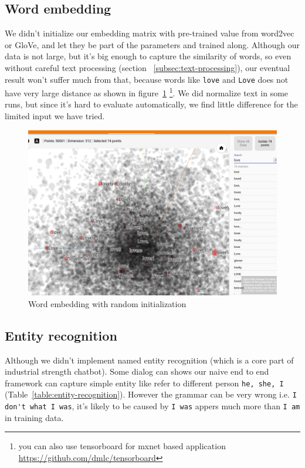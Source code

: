 \documentclass{article}
\begin{document}
\subsection{Word embedding}
\label{subsec:word-embedding}

We didn't initialize our embedding matrix with pre-trained value from word2vec or GloVe, and let they be part of the parameters and trained along.
Although our data is not large, but it's big enough to capture the similarity of words, so even without careful text processing (section ~\ref{subsec:text-processing}),
our eventual result won't suffer much from that,
because words like \verb+love+ and \verb+Love+ does not have very large distance as shown in figure~\ref{fig:embedding-love}
\footnote{you can also use tensorboard for mxnet based application \url{https://github.com/dmlc/tensorboard}}.
We did normalize text in some runs, but since it's hard to evaluate automatically,
we find little difference for the limited input we have tried.

\begin{figure}[h]
    \centering
    \includegraphics[width=\columnwidth]{embedding-love}
    \caption{Word embedding with random initialization}
    \label{fig:embedding-love}
\end{figure}

\subsection{Entity recognition}
\label{subsec:entity-recognition}

Although we didn't implement named entity recognition (which is a core part of industrial strength chatbot).
Some dialog can shows our naive end to end framework can capture simple entity like refer to different person \verb+he, she, I+
(Table~\ref{table:entity-recognition}).
However the grammar can be very wrong i.e. \verb+I don't what I was+,
it's likely to be caused by \verb+I was+ appers much more than \verb+I am+ in training data.
\end{document}
